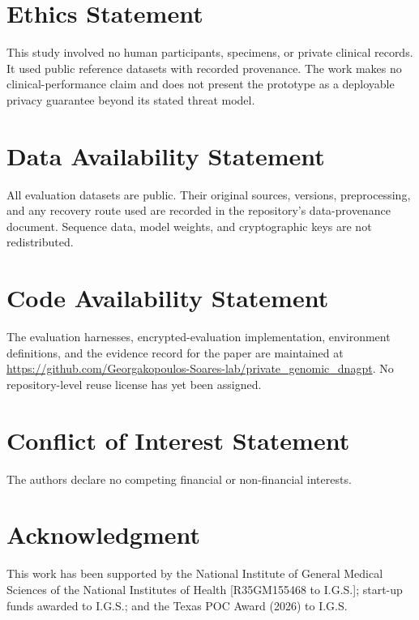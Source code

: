 
\section*{Ethics Statement}

This study involved no human participants, specimens, or private clinical records. It used public
reference datasets with recorded provenance. The work makes no clinical-performance claim and
does not present the prototype as a deployable privacy guarantee beyond its stated threat model.

\section*{Data Availability Statement}

All evaluation datasets are public. Their original sources, versions, preprocessing, and any
recovery route used are recorded in the repository's data-provenance document. Sequence data,
model weights, and cryptographic keys are not redistributed.

\section*{Code Availability Statement}

The evaluation harnesses, encrypted-evaluation implementation, environment definitions, and the
evidence record for the paper are maintained at
\url{https://github.com/Georgakopoulos-Soares-lab/private_genomic_dnagpt}. No repository-level
reuse license has yet been assigned.

\section*{Conflict of Interest Statement}

The authors declare no competing financial or non-financial interests.

\section*{Acknowledgment}

This work has been supported by the National Institute of General Medical Sciences of the
National Institutes of Health [R35GM155468 to I.G.S.]; start-up funds awarded to I.G.S.; and the
Texas POC Award (2026) to I.G.S.
